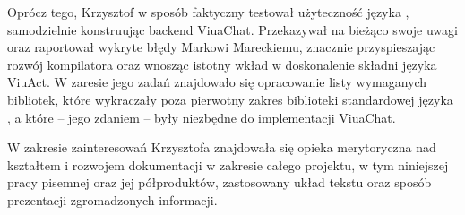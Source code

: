 Oprócz tego, Krzysztof w sposób faktyczny testował użyteczność języka
\ViuAct, samodzielnie konstruując backend ViuaChat. Przekazywał na bieżąco
swoje uwagi oraz raportował wykryte błędy Markowi Mareckiemu, znacznie
przyspieszając rozwój kompilatora oraz wnosząc istotny wkład w doskonalenie
składni języka ViuAct. W zaresie jego zadań znajdowało się opracowanie listy
wymaganych bibliotek, które wykraczały poza pierwotny zakres biblioteki
standardowej języka \ViuAct, a które -- jego zdaniem -- były niezbędne
do implementacji ViuaChat.

W zakresie zainteresowań Krzysztofa znajdowała się opieka merytoryczna nad
kształtem i rozwojem dokumentacji w zakresie całego projektu, w tym niniejszej
pracy pisemnej oraz jej półproduktów, zastosowany układ tekstu oraz sposób
prezentacji zgromadzonych informacji.
